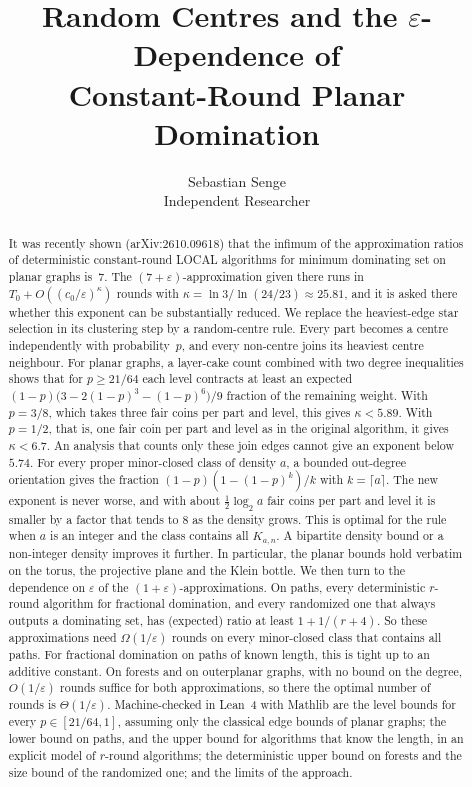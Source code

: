\documentclass[11pt]{article}
\title{Random Centres and the \texorpdfstring{$\varepsilon$}{epsilon}-Dependence of\\ Constant-Round Planar Domination}
\author{Sebastian Senge\\ Independent Researcher}
\date{}
\theoremstyle{remark}
\begin{document}
\maketitle

\begin{abstract}
It was recently shown (arXiv:2610.09618) that the infimum of the approximation ratios of deterministic
constant-round LOCAL algorithms for minimum dominating set on planar graphs is~$7$. The
$(7+\varepsilon)$-approximation given there runs in $T_0+O((c_0/\varepsilon)^{\kappa})$ rounds with
$\kappa=\ln 3/\ln(24/23)\approx 25.81$, and it is asked there whether this exponent can be
substantially reduced. We replace the heaviest-edge star selection in its clustering step by a
random-centre rule. Every part becomes a centre independently with probability~$p$, and every
non-centre joins its heaviest centre neighbour. For planar graphs, a layer-cake count combined
with two degree inequalities shows that for $p\ge21/64$ each level contracts at least an expected
$(1-p)\big(3-2(1-p)^3-(1-p)^6\big)/9$ fraction of the remaining weight. With $p=3/8$, which takes three fair coins per part and level,
this gives $\kappa<5.89$. With $p=1/2$, that is, one fair coin per part and level as in the
original algorithm, it gives $\kappa<6.7$. An analysis that counts only these join edges cannot
give an exponent below $5.74$. For every proper minor-closed class of density $a$, a
bounded out-degree orientation gives the fraction $(1-p)(1-(1-p)^k)/k$ with $k=\lceil a\rceil$.
The new exponent is never worse, and with about $\frac12\log_2 a$ fair coins per part and level
it is smaller by a factor that tends to $8$ as the density grows. This is optimal for the rule when $a$ is an integer and the class contains all $K_{a,n}$.
A bipartite density bound or a non-integer density improves it further. In particular, the planar
bounds hold verbatim on the torus, the projective plane and the Klein bottle. We then turn to the
dependence on $\varepsilon$ of the $(1+\varepsilon)$-approximations. On paths, every deterministic
$r$-round algorithm for fractional domination, and every randomized one that always outputs a
dominating set, has (expected) ratio at least $1+1/(r+4)$. So these approximations need $\Omega(1/\varepsilon)$
rounds on every minor-closed class that contains all paths. For fractional domination on paths of
known length, this is tight up to an additive constant. On forests and on outerplanar graphs, with no bound on the degree,
$O(1/\varepsilon)$ rounds suffice for both approximations, so there the optimal number of rounds is
$\Theta(1/\varepsilon)$. Machine-checked in Lean~4 with Mathlib are the level bounds for every
$p\in[21/64,1]$, assuming only the classical edge bounds of planar graphs; the lower bound on paths,
and the upper bound for algorithms that know the length, in an explicit model of $r$-round
algorithms; the deterministic upper bound on forests and the size bound of the randomized one;
and the limits of the approach.
\end{abstract}
\end{document}

